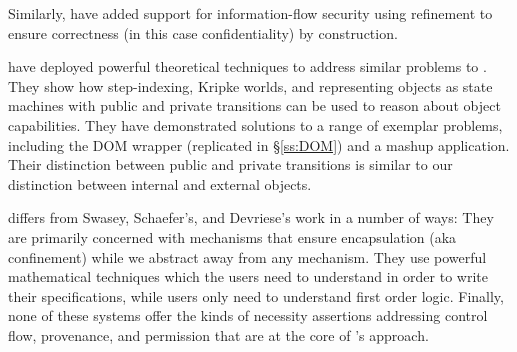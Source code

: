 %
Similarly, \cite{schaeferCbC} have
added  support for information-flow security %
using refinement to ensure correctness (in this case confidentiality) by
construction. 





\cite{dd}  have deployed
   powerful %
  theoretical techniques to address similar problems to \Nec.  %
  They show how step-indexing, Kripke worlds, and representing objects
as state machines with public and private transitions can be used to
reason about %
object capabilities.
They have demonstrated solutions to a range of exemplar problems,
including the DOM wrapper (replicated in 
\S\ref{ss:DOM}) and a mashup application.
Their distinction
between public and private transitions %
is similar to our
distinction between internal and external objects.

 

\Nec differs from Swasey, Schaefer's, and Devriese's work in a number of ways:
They are primarily concerned with %
mechanisms that ensure encapsulation (aka 
confinement) while we abstract away from any mechanism.
They use powerful mathematical techniques
which  the users need  to understand in order to write their specifications,
while \Nec users only need  to understand  first order logic.
Finally, none of these systems offer the kinds of
necessity assertions addressing control flow, provenance, and permission 
that are at the core of \Nec's approach.



